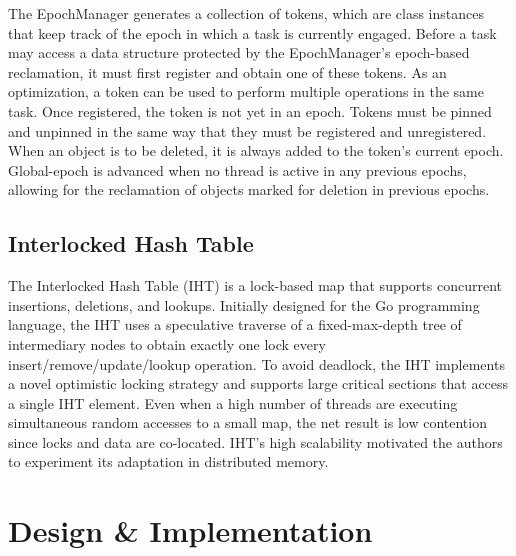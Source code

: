 \documentclass[letterpaper, 10 pt, conference]{ieeeconf}  %
\begin{document}
The EpochManager generates a collection of tokens, which are class instances that keep track of the epoch in which a task is currently engaged. Before a task may access a data structure protected by the EpochManager's epoch-based reclamation, it must first register and obtain one of these tokens. As an optimization, a token can be used to perform multiple operations in the same task. Once registered, the token is not yet in an epoch. Tokens must be pinned and unpinned in the same way that they must be registered and unregistered. When an object is to be deleted, it is always added to the token's current epoch. Global-epoch is advanced when no thread is active in any previous epochs, allowing for the reclamation of objects marked for deletion in previous epochs.


\subsection{Interlocked Hash Table}
The Interlocked Hash Table (IHT) is a lock-based map that supports concurrent insertions, deletions, and lookups. Initially designed for the Go programming language, the IHT uses a speculative traverse of a fixed-max-depth tree of intermediary nodes to obtain exactly one lock every insert/remove/update/lookup operation. To avoid deadlock, the IHT implements a novel optimistic locking strategy and supports large critical sections that access a single IHT element. Even when a high number of threads are executing simultaneous random accesses to a small map, the net result is low contention since locks and data are co-located. IHT's high scalability motivated the authors to experiment its adaptation in distributed memory.

\section{Design \& Implementation}
\end{document}

